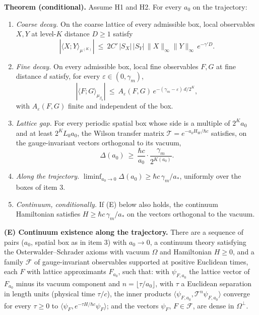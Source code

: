 \documentclass[11pt,a4paper]{article}
\newcommand{\tightlist}{\setlength{\itemsep}{0pt}\setlength{\parskip}{0pt}}
\begin{document}
\textbf{Theorem (conditional).} Assume H1 and H2. For every \(a_0\) on
the trajectory:

\begin{enumerate}
\def\labelenumi{\arabic{enumi}.}
\tightlist
\item
  \emph{Coarse decay.} On the coarse lattice of every admissible box,
  local observables \(X,Y\) at level-\(K\) distance \(D\ge1\) satisfy
  \[|\langle X;Y\rangle_{\mu^{(K)}}|\ \le\ 2C'\,|S_X|\,|S_Y|\,\|X\|_\infty\|Y\|_\infty\,e^{-\gamma'D}.\]
\item
  \emph{Fine decay.} On every admissible box, local fine observables
  \(F,G\) at fine distance \(d\) satisfy, for every
  \(\varepsilon\in(0,\gamma_m)\),
  \[|\langle F;G\rangle_{\mu_{\beta_0}}|\ \le\ A_\varepsilon(F,G)\,e^{-(\gamma_m-\varepsilon)\,d/2^K},\]
  with \(A_\varepsilon(F,G)\) finite and independent of the box.
\item
  \emph{Lattice gap.} For every periodic spatial box whose side is a
  multiple of \(2^Ka_0\) and at least \(2^KL_0a_0\), the Wilson transfer
  matrix \(\mathcal T=e^{-a_0H_W/\hbar c}\) satisfies, on the
  gauge-invariant vectors orthogonal to its vacuum,
  \[\Delta(a_0)\ \ge\ \frac{\hbar c}{a_0}\cdot\frac{\gamma_m}{2^{K(a_0)}} .\]
\item
  \emph{Along the trajectory.}
  \(\liminf_{a_0\to0}\Delta(a_0)\ge\hbar c\,\gamma_m/a_*\), uniformly
  over the boxes of item 3.
\item
  \emph{Continuum, conditionally.} If (E) below also holds, the
  continuum Hamiltonian satisfies \(H\ge\hbar c\,\gamma_m/a_*\) on the
  vectors orthogonal to the vacuum.
\end{enumerate}

\textbf{(E) Continuum existence along the trajectory.} There are a
sequence of pairs (\(a_0\), spatial box as in item 3) with \(a_0\to0\),
a continuum theory satisfying the Osterwalder--Schrader axioms with
vacuum \(\Omega\) and Hamiltonian \(H\ge0\), and a family \(\mathcal F\)
of gauge-invariant observables supported at positive Euclidean times,
each \(F\) with lattice approximants \(F_{a_0}\), such that: with
\(\psi_{F,a_0}\) the lattice vector of \(F_{a_0}\) minus its vacuum
component and \(n=\lfloor\tau/a_0\rfloor\), with \(\tau\) a Euclidean
separation in length units (physical time \(\tau/c\)), the inner
products \(\langle\psi_{F,a_0},\mathcal T^n\psi_{F,a_0}\rangle\)
converge for every \(\tau\ge0\) to
\(\langle\psi_F,e^{-\tau H/\hbar c}\psi_F\rangle\); and the vectors
\(\psi_F\), \(F\in\mathcal F\), are dense in \(\Omega^\perp\).
\end{document}

